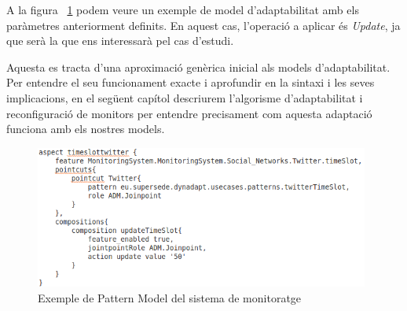 A la figura ~\ref{fig:aspect} podem veure un exemple de model d'adaptabilitat amb els paràmetres anteriorment definits. En aquest cas, l'operació a aplicar és \textit{Update}, ja que serà la que ens interessarà pel cas d'estudi.

Aquesta es tracta d'una aproximació genèrica inicial als models d'adaptabilitat. Per entendre el seu funcionament exacte i aprofundir en la sintaxi i les seves implicacions, en el següent capítol descriurem l'algorisme d'adaptabilitat i reconfiguració de monitors per entendre precisament com aquesta adaptació funciona amb els nostres models.\\

\begin{figure}
\centering
\includegraphics[width=11cm]{Figures/Figure38}
\decoRule
\caption{Exemple de Pattern Model del sistema de monitoratge}
\label{fig:aspect}
\end{figure}
